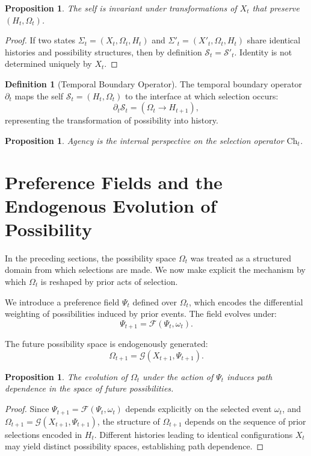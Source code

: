 \documentclass[11pt,a4paper]{article}
\newtheorem{proposition}[theorem]{Proposition}
\theoremstyle{definition}
\newtheorem{definition}[theorem]{Definition}
\theoremstyle{remark}
\begin{document}
\begin{proposition}
The self is invariant under transformations of $X_t$ that preserve $(H_t, \Omega_t)$.
\end{proposition}

\begin{proof}
If two states $\Sigma_t = (X_t, \Omega_t, H_t)$ and $\Sigma'_t = (X'_t, \Omega_t, H_t)$ share identical histories and possibility structures, then by definition $\mathcal{S}_t = \mathcal{S}'_t$. Identity is not determined uniquely by $X_t$.
\end{proof}

\begin{definition}[Temporal Boundary Operator]
The temporal boundary operator $\partial_t$ maps the self $\mathcal{S}_t = (H_t, \Omega_t)$ to the interface at which selection occurs:
\[
\partial_t \mathcal{S}_t = (\Omega_t \rightarrow H_{t+1}),
\]
representing the transformation of possibility into history.
\end{definition}

\begin{proposition}
Agency is the internal perspective on the selection operator $\mathrm{Ch}_t$.
\end{proposition}

\section{Preference Fields and the Endogenous Evolution of Possibility}

In the preceding sections, the possibility space $\Omega_t$ was treated as a structured domain from which selections are made. We now make explicit the mechanism by which $\Omega_t$ is reshaped by prior acts of selection.

We introduce a preference field $\Psi_t$ defined over $\Omega_t$, which encodes the differential weighting of possibilities induced by prior events. The field evolves under:
\[
\Psi_{t+1} = \mathcal{F}(\Psi_t, \omega_t).
\]

The future possibility space is endogenously generated:
\[
\Omega_{t+1} = \mathcal{G}(X_{t+1}, \Psi_{t+1}).
\]

\begin{proposition}
The evolution of $\Omega_t$ under the action of $\Psi_t$ induces path dependence in the space of future possibilities.
\end{proposition}

\begin{proof}
Since $\Psi_{t+1} = \mathcal{F}(\Psi_t, \omega_t)$ depends explicitly on the selected event $\omega_t$, and $\Omega_{t+1} = \mathcal{G}(X_{t+1}, \Psi_{t+1})$, the structure of $\Omega_{t+1}$ depends on the sequence of prior selections encoded in $H_t$. Different histories leading to identical configurations $X_t$ may yield distinct possibility spaces, establishing path dependence.
\end{proof}
\end{document}

